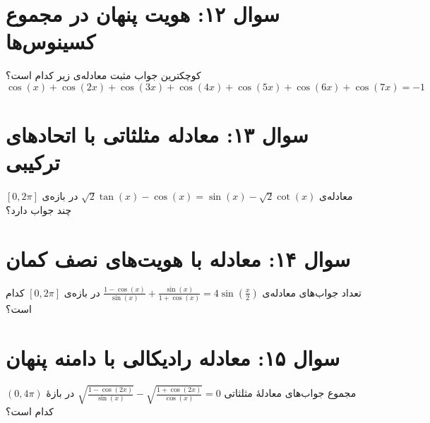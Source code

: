 \documentclass[12pt]{article}
\begin{document}
	
	\vspace{1cm}
	\hrulefill
	\vspace{1cm}
	\section*{سوال ۱۲: هویت پنهان در مجموع کسینوس‌ها}
	کوچکترین جواب مثبت معادله‌ی زیر کدام است؟
	\[ \cos(x) + \cos(2x) + \cos(3x) + \cos(4x) + \cos(5x) + \cos(6x) + \cos(7x) = -1 \]
	
	
	\vspace{1cm}
	\hrulefill
	\vspace{1cm}
	\section*{سوال ۱۳: معادله مثلثاتی با اتحادهای ترکیبی}
	معادله‌ی \( \sqrt{2} \tan(x) - \cos(x) = \sin(x) - \sqrt{2} \cot(x) \) در بازه‌ی \( [0, 2\pi] \) چند جواب دارد؟
	
	
	\vspace{1cm}
	\hrulefill
	\vspace{1cm}
	\section*{سوال ۱۴: معادله با هویت‌های نصف کمان}
	تعداد جواب‌های معادله‌ی \( \frac{1 - \cos(x)}{\sin(x)} + \frac{\sin(x)}{1 + \cos(x)} = 4\sin(\frac{x}{2}) \) در بازه‌ی \( [0, 2\pi] \) کدام است؟
	
	
	\vspace{1cm}
	\hrulefill
	\vspace{1cm}
	\section*{سوال ۱۵: معادله رادیکالی با دامنه پنهان}
	مجموع جواب‌های معادلهٔ مثلثاتی \( \sqrt{\frac{1-\cos(2x)}{\sin(x)}} - \sqrt{\frac{1+\cos(2x)}{\cos(x)}} = 0 \) در بازهٔ \( (0, 4\pi) \) کدام است؟
	
\end{document}
